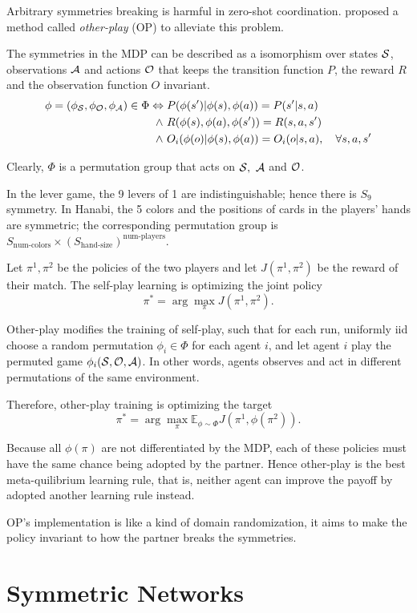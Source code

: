 \documentclass[12pt]{article}
\begin{document}
\begin{spacing}{1.15}
Arbitrary symmetries breaking is harmful in zero-shot coordination. \cite{hu2020other} proposed a method called \textsl{other-play} (OP) to alleviate this problem.

The symmetries in the MDP can be described as a isomorphism over states $\S$, observations $\A$ and actions $\O$ that keeps the transition function $P$, the reward $R$ and the observation function $O$ invariant.
\begin{align*}
  \phi=(\phi_\S,\phi_\O,\phi_\A)\in\Phi
  \Leftrightarrow{}& P(\phi(s')|\phi(s),\phi(a))=P(s'|s,a) \\
  \wedge~{}& R(\phi(s),\phi(a),\phi(s'))=R(s,a,s') \\
  \wedge~{}& O_i(\phi(o)|\phi(s),\phi(a))=O_i(o|s,a),\quad\forall s,a,s'
\end{align*}

Clearly, $\Phi$ is a permutation group that acts on $\S,~\A$ and $\O$.

In the lever game, the 9 levers of 1 are indistinguishable; hence there is $S_9$ symmetry. In Hanabi, the 5 colors and the positions of cards in the players' hands are symmetric; the corresponding permutation group is $S_{\text{num-colors}}\times (S_{\text{hand-size}})^{\text{num-players}}$.

Let $\pi^1, \pi^2$ be the policies of the two players and let $J(\pi^1, \pi^2)$ be the reward of their match. The self-play learning is optimizing the joint policy \[\pi^* = \arg\max_{\pi} J(\pi^1, \pi^2).\]

Other-play modifies the training of self-play, such that for each run, uniformly iid choose a random permutation $\phi_i\in\Phi$ for each agent $i$, and let agent $i$ play the permuted game $\phi_i(\S,\O,\A)$. In other words, agents observes and act in different permutations of the same environment.

Therefore, other-play training is optimizing the target \[\pi^* = \arg\max_{\pi} \mathbb{E}_{\phi\sim \Phi} J(\pi^1, \phi(\pi^2)).\]

Because all $\phi(\pi)$ are not differentiated by the MDP, each of these policies must have the same chance being adopted by the partner. Hence other-play is the best meta-quilibrium learning rule, that is, neither agent can improve the payoff by adopted another learning rule instead.

OP's implementation is like a kind of domain randomization, it aims to make the policy invariant to how the partner breaks the symmetries.

\section{Symmetric Networks}

\end{spacing}
\end{document}
